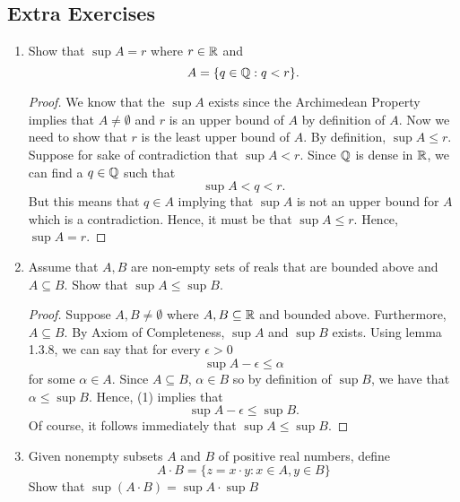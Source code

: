     \subsection{Extra Exercises}
    \begin{enumerate}
        \item Show that \( \sup A = r \) where \( r \in \mathbb{R} \) and 
        \[A = \{ q \in \mathbb{Q}: q < r \}.\]
   

            \begin{proof}
                We know that the \( \sup A \) exists since the Archimedean Property implies that \( A \neq \emptyset \) and \( r \) is an upper bound of \( A \) by definition of \( A \). Now we need to show that \( r \) is the least upper bound of \( A \). By definition, \( \sup A \leq r \). Suppose for sake of contradiction that \( \sup A < r \). Since \( \mathbb{Q} \) is dense in \( \mathbb{R} \), we can find a \( q \in \mathbb{Q} \) such that \[ \sup A < q < r .\]
                But this means that \( q \in A \) implying that \( \sup A \) is not an upper bound for \( A \) which is a contradiction. Hence, it must be that \( \sup A \leq r \). Hence, \( \sup A = r \).
            \end{proof}
        
        \item Assume that \( A, B \) are non-empty sets of reals that are bounded above and \( A \subseteq B \). Show that \( \sup A \leq \sup B \). 

            \begin{proof}
                Suppose \( A, B \neq \emptyset \) where \( A, B \subseteq \mathbb{R} \) and bounded above. Furthermore, \( A \subseteq B \). By Axiom of Completeness, \( \sup A \) and \( \sup B \) exists. Using lemma 1.3.8, we can say that for every \( \epsilon > 0 \) 
                \[ \sup A - \epsilon \leq \alpha \tag{1} \]
                for some \(\alpha \in A \). Since \( A \subseteq B  \), \( \alpha \in B \) so by definition of \( \sup B \), we have that  \( \alpha \leq \sup B \). Hence, (1) implies that 
                \[ \sup A - \epsilon \leq \sup B.\]
                Of course, it follows immediately that \( \sup A \leq \sup B \).
            \end{proof}
        

        \item                
        Given nonempty subsets \( A \) and \( B \) of positive real numbers, define 
        \[  A \cdot B = \{ z = x \cdot y : x \in A, y \in B \} \]
        Show that \( \sup (A \cdot B ) = \sup A \cdot \sup B \)


\end{enumerate}
